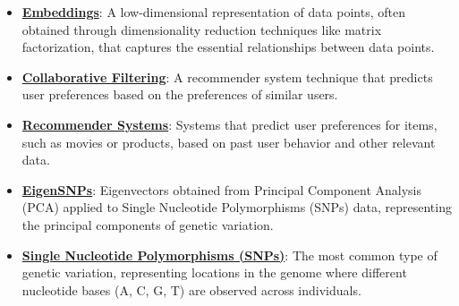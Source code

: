 \documentclass{article}%
\begin{document}
\begin{itemize}[leftmargin=*]
\item \href{https://purdue.brightspace.com/d2l/common/assets/pdfjs-d2l-dist/1.0.14-legacy/web/viewer.html?file=%2Fcontent%2Fenforced%2F1095467-wl.202510.CS.24300.001%2F11L2-svd-pca-recommender.pdf%3Fou%3D1095467&lang=en-us&container=d2l-fileviewer-rendered-pdf&fullscreen=d2l-fileviewer-rendered-pdf-dialog&height=667#page=5}{\textbf{Embeddings}}: A low-dimensional representation of data points, often obtained through dimensionality reduction techniques like matrix factorization, that captures the essential relationships between data points.%
\item \href{https://purdue.brightspace.com/d2l/common/assets/pdfjs-d2l-dist/1.0.14-legacy/web/viewer.html?file=%2Fcontent%2Fenforced%2F1095467-wl.202510.CS.24300.001%2F11L2-svd-pca-recommender.pdf%3Fou%3D1095467&lang=en-us&container=d2l-fileviewer-rendered-pdf&fullscreen=d2l-fileviewer-rendered-pdf-dialog&height=667#page=33}{\textbf{Collaborative Filtering}}: A recommender system technique that predicts user preferences based on the preferences of similar users.%
\item \href{https://purdue.brightspace.com/d2l/common/assets/pdfjs-d2l-dist/1.0.14-legacy/web/viewer.html?file=%2Fcontent%2Fenforced%2F1095467-wl.202510.CS.24300.001%2F11L2-svd-pca-recommender.pdf%3Fou%3D1095467&lang=en-us&container=d2l-fileviewer-rendered-pdf&fullscreen=d2l-fileviewer-rendered-pdf-dialog&height=667#page=29}{\textbf{Recommender Systems}}: Systems that predict user preferences for items, such as movies or products, based on past user behavior and other relevant data.%
\item \href{https://purdue.brightspace.com/d2l/common/assets/pdfjs-d2l-dist/1.0.14-legacy/web/viewer.html?file=%2Fcontent%2Fenforced%2F1095467-wl.202510.CS.24300.001%2F11L2-svd-pca-recommender.pdf%3Fou%3D1095467&lang=en-us&container=d2l-fileviewer-rendered-pdf&fullscreen=d2l-fileviewer-rendered-pdf-dialog&height=667#page=28}{\textbf{EigenSNPs}}: Eigenvectors obtained from Principal Component Analysis (PCA) applied to Single Nucleotide Polymorphisms (SNPs) data, representing the principal components of genetic variation.%
\item \href{https://purdue.brightspace.com/d2l/common/assets/pdfjs-d2l-dist/1.0.14-legacy/web/viewer.html?file=%2Fcontent%2Fenforced%2F1095467-wl.202510.CS.24300.001%2F11L2-svd-pca-recommender.pdf%3Fou%3D1095467&lang=en-us&container=d2l-fileviewer-rendered-pdf&fullscreen=d2l-fileviewer-rendered-pdf-dialog&height=667#page=26}{\textbf{Single Nucleotide Polymorphisms (SNPs)}}: The most common type of genetic variation, representing locations in the genome where different nucleotide bases (A, C, G, T) are observed across individuals.%

\end{itemize}
\end{document}
